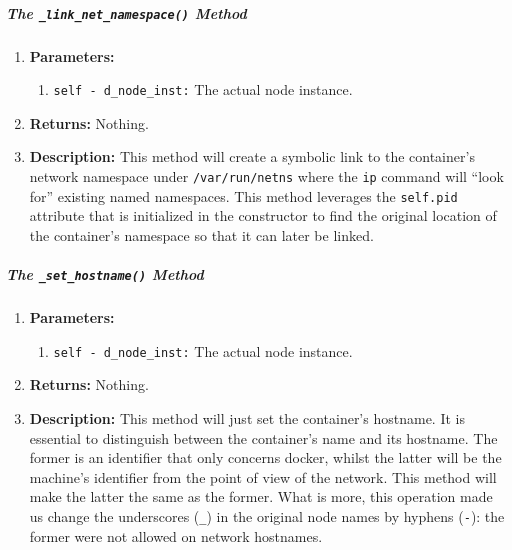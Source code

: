                     \subparagraph{The \texttt{\_link\_net\_namespace()} Method}
                        \begin{enumerate}
                            \item \textbf{Parameters:}
                            \begin{enumerate}
                                \item \texttt{self - d\_node\_inst:} The actual node instance.
                            \end{enumerate}
                            \item \textbf{Returns:} Nothing.
                            \item \textbf{Description:} This method will create a symbolic link to the container's network namespace under \texttt{/var/run/netns} where the \texttt{ip} command will ``look for'' existing named namespaces. This method leverages the \texttt{self.pid} attribute that is initialized in the constructor to find the original location of the container's namespace so that it can later be linked.
                        \end{enumerate}

                    \subparagraph{The \texttt{\_set\_hostname()} Method}
                        \begin{enumerate}
                            \item \textbf{Parameters:}
                            \begin{enumerate}
                                \item \texttt{self - d\_node\_inst:} The actual node instance.
                            \end{enumerate}
                            \item \textbf{Returns:} Nothing.
                            \item \textbf{Description:} This method will just set the container's hostname. It is essential to distinguish between the container's name and its hostname. The former is an identifier that only concerns docker, whilst the latter will be the machine's identifier from the point of view of the network. This method will make the latter the same as the former. What is more, this operation made us change the underscores (\texttt{\_}) in the original node names by hyphens (\texttt{-}): the former were not allowed on network hostnames.
                        \end{enumerate}


